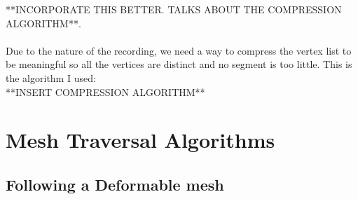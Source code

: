 \documentclass[conference]{acmsiggraph}
\begin{document}
**INCORPORATE THIS BETTER. TALKS ABOUT THE COMPRESSION ALGORITHM**. \\
\\
Due to the nature of the recording, we need a way to compress the vertex list to be meaningful so all the vertices are distinct and no segment is too little. This is the algorithm I used: \\
**INSERT COMPRESSION ALGORITHM**

\section{Mesh Traversal Algorithms}

\subsection{Following a Deformable mesh}
\end{document}
